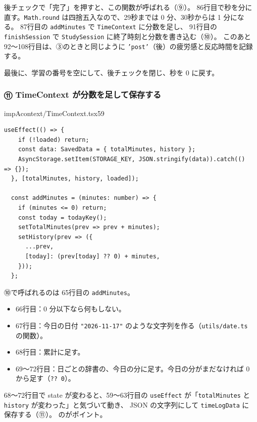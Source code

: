 後チェックで「完了」を押すと、この関数が呼ばれる（⑨）。
86行目で秒を分に直す。\texttt{Math.round} は四捨五入なので、29秒までは 0 分、30秒からは 1 分になる。
87行目の \texttt{addMinutes} で \texttt{TimeContext} に分数を足し、
91行目の \texttt{finishSession} で \texttt{StudySession} に終了時刻と分数を書き込む（⑩）。
このあと92〜108行目は、③のときと同じように \texttt{'post'}（後）の疲労感と反応時間を記録する。

\begin{codebox}{impA}{app/(tabs)/timer.tsx}{109}
    }
    currentSessionIdRef.current = null;
    setPostModalVisible(false);
    setSeconds(0);
  };
\end{codebox}

最後に、学習の番号を空にして、後チェックを閉じ、秒を 0 に戻す。

\subsubsection{⑪ TimeContext が分数を足して保存する}

\begin{codeframe}{impA}{context/TimeContext.tsx}{59}
\begin{lstlisting}[style=kkts, firstnumber=59]
  useEffect(() => {
    if (!loaded) return;
    const data: SavedData = { totalMinutes, history };
    AsyncStorage.setItem(STORAGE_KEY, JSON.stringify(data)).catch(() => {});
  }, [totalMinutes, history, loaded]);

  const addMinutes = (minutes: number) => {
    if (minutes <= 0) return;
    const today = todayKey();
    setTotalMinutes(prev => prev + minutes);
    setHistory(prev => ({
      ...prev,
      [today]: (prev[today] ?? 0) + minutes,
    }));
  };
\end{lstlisting}
\end{codeframe}

⑩で呼ばれるのは 65行目の \texttt{addMinutes}。
\begin{itemize}
  \item 66行目：0 分以下なら何もしない。
  \item 67行目：今日の日付 \texttt{"2026-11-17"} のような文字列を作る（\texttt{utils/date.ts} の関数）。
  \item 68行目：累計に足す。
  \item 69〜72行目：日ごとの辞書の、今日の分に足す。今日の分がまだなければ 0 から足す（\texttt{?? 0}）。
\end{itemize}
68〜72行目で state が変わると、59〜63行目の \texttt{useEffect} が「\texttt{totalMinutes} と \texttt{history} が変わった」と気づいて動き、
JSON の文字列にして \texttt{timeLogData} に保存する（⑪）。
のがポイント。

